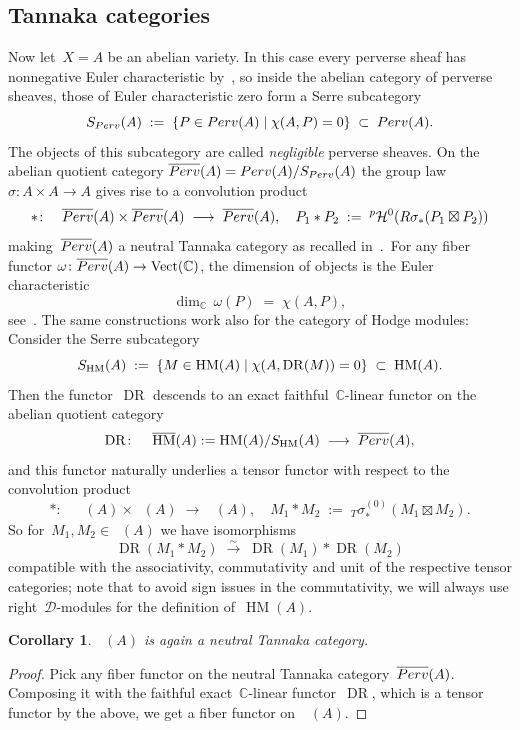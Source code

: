 \documentclass[a4paper]{amsart}
\newcommand{\bbC}{\mathbb{C}}
\newcommand{\cD}{\mathcal{D}}
\newcommand{\cH}{\mathcal{H}}
\newcommand{\rS}{\textup{S}}
\newcommand{\sssT}{\scriptscriptstyle{T}}
\newcommand{\tf}[1]{{_{\sssT}{#1}}}
\newcommand{\Perv}{\textup{Perv}}
\newcommand{\Pbar}{\overline{\Perv}}
\DeclareMathOperator{\Vect}{Vect}
\DeclareMathOperator{\DR}{DR}
\DeclareMathOperator{\HM}{HM}
\DeclareMathOperator{\Mbar}{\overline{\HM}}
\theoremstyle{plain}
\newtheorem{corollary}[theorem]{Corollary}
\theoremstyle{definition}
\numberwithin{equation}{section}
\begin{document}
\subsection{Tannaka categories} \label{sec:tannaka}
Now let~$X=A$ be an abelian variety. In this case every perverse sheaf has nonnegative Euler characteristic by~\cite[cor.~1.4]{FraneckiKapranov}, so inside the abelian category of perverse sheaves, those of Euler characteristic zero form a Serre subcategory 
%
\[
 \rS_{\Perv}(A) \;:=\; \{ P \in \Perv(A) \mid \chi(A, P)=0\} \;\subset\; \Perv(A).
\] 
%
The objects of this subcategory are called \emph{negligible} perverse sheaves. On the abelian quotient category 
$\Pbar(A)=\Perv(A)/\rS_{\Perv}(A)$ the group law~$\sigma \colon A\times A \to A$ gives rise to  a convolution product
%
\[
*\colon \quad \Pbar(A) \times \Pbar(A) \;\longrightarrow\; \Pbar(A),
\quad P_1 * P_2 \;:=\; {}^p \cH^0(R \sigma_*(P_1\boxtimes P_2))
\]
%
making~$\Pbar(A)$ a neutral Tannaka category as recalled in~\cite[sect.~3.1]{JKLM}.~For any fiber functor $\omega\colon \Pbar(A) \to \Vect(\bbC)$, the dimension of objects is the Euler characteristic
%
\begin{equation} \label{eq:dim}
 \dim_\bbC \,\omega(P) \;=\; \chi(A, P),
\end{equation}
see~\cite[proof of cor.~4.2]{KWVanishing}. The same constructions work also for the category of Hodge modules: Consider the Serre subcategory
%
\[
 \rS_{\HM}(A) \;:=\; \{ M\in \HM(A) \mid \chi(A, \DR(M)) = 0 \} \;\subset\; \HM(A).
\]
%
Then the functor~$\DR$ descends to an exact faithful~$\bbC$-linear functor on the abelian quotient category
%
\[
 \DR\colon \quad \Mbar(A) := \HM(A)/\rS_{\HM}(A) \;\longrightarrow\; \Pbar(A),
\]
%
and this functor naturally underlies a tensor functor with respect to the convolution product 
%
\[
 *\colon \quad \Mbar(A) \times \Mbar(A) \;\longrightarrow\; \Mbar(A), 
 \quad M_1 * M_2 \;:=\; \tf{\sigma}_*^{(0)}(M_1\boxtimes M_2).
\] 
%
So for~$M_1, M_2\in \Mbar(A)$ we have isomorphisms
%
\[
 \DR(M_1 \ast M_2) \;\stackrel{\sim}{\longrightarrow}\; \DR(M_1)\ast \DR(M_2)
\]
%
compatible with the associativity, commutativity and unit of the respective tensor categories; note that to avoid sign issues in the commutativity, we will always use right~$\cD$-modules for the definition of~$\HM(A)$. 

\begin{corollary} 
$\Mbar(A)$ is again a neutral Tannaka category.
\end{corollary} 

\begin{proof}
Pick any fiber functor on the neutral Tannaka category~$\Pbar(A)$. Composing it with the faithful exact~$\bbC$-linear functor~$\DR$, which is a tensor functor by the above, we get a fiber functor on~$\Mbar(A)$.
\end{proof}
\end{document}
